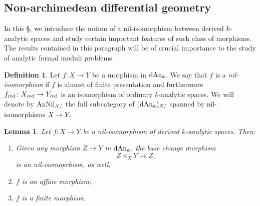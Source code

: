 \documentclass[10pt,a4paper,reqno]{amsart} %
\theoremstyle{plain}
\newtheorem{lem}[thm]{Lemma}
\theoremstyle{definition}
\newtheorem{defin}[thm]{Definition}
\theoremstyle{remark}
\numberwithin{equation}{section}
\begin{document}
\subsection{Non-archimedean differential geometry} In this \S, we introduce the notion of a nil-isomorphism between derived
$k$-analytic spaces and study certain important features of such class of morphisms. The results contained in this paragraph will be of
crucial importance to the study of analytic formal moduli problems.

\begin{defin}
    Let $f \colon X \to Y$ be a morphism in $\mathrm{dAn}_k$. We say that $f$ is a \emph{nil-isomorphism} if $f$ is almost of finite presentation
    and furthermore
    $f_{\mathrm{red}} \colon X_{\mathrm{red}} \to
    Y_{\mathrm{red}}$ is an isomorphism of ordinary $k$-analytic spaces. 
    We will denote by $\mathrm{AnNil}_{X/ }$ the full subcategory of $(\mathrm{dAn}_k)_{X/}$
    spanned by nil-isomorphisms $X \to Y$.
\end{defin}

\begin{lem} \label{lem:nil-isos_are_affine_morphisms}
    Let $f \colon X \to Y$ be a nil-isomorphism of derived $k$-analytic spaces. Then:
    \begin{enumerate}
        \item Given any morphism $Z \to Y$ in $\mathrm{dAn}_k$, the base change morphism
            \[
                Z \times_X Y \to Z,  
            \]
        is an nil-isomoprhism, as well;
        \item $f$ is an affine morphism;
        \item $f$ is a finite morphism.
    \end{enumerate}
\end{lem}
\end{document}

